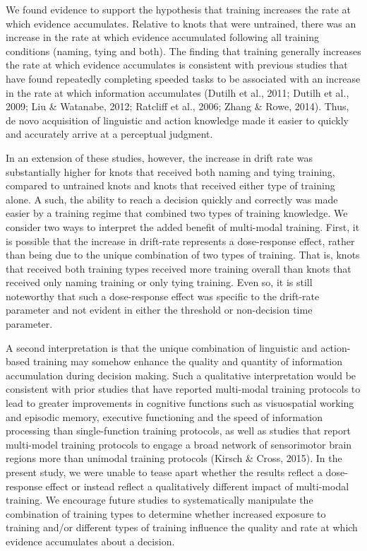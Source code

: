 \documentclass[
  man, donotrepeattitle,floatsintext]{apa6}
\begin{document}
We found evidence to support the hypothesis that training increases the rate at which evidence accumulates. Relative to knots that were untrained, there was an increase in the rate at which evidence accumulated following all training conditions (naming, tying and both). The finding that training generally increases the rate at which evidence accumulates is consistent with previous studies that have found repeatedly completing speeded tasks to be associated with an increase in the rate at which information accumulates (Dutilh et al., 2011; Dutilh et al., 2009; Liu \& Watanabe, 2012; Ratcliff et al., 2006; Zhang \& Rowe, 2014). Thus, de novo acquisition of linguistic and action knowledge made it easier to quickly and accurately arrive at a perceptual judgment.

In an extension of these studies, however, the increase in drift rate was substantially higher for knots that received both naming and tying training, compared to untrained knots and knots that received either type of training alone. A such, the ability to reach a decision quickly and correctly was made easier by a training regime that combined two types of training knowledge. We consider two ways to interpret the added benefit of multi-modal training. First, it is possible that the increase in drift-rate represents a dose-response effect, rather than being due to the unique combination of two types of training. That is, knots that received both training types received more training overall than knots that received only naming training or only tying training. Even so, it is still noteworthy that such a dose-response effect was specific to the drift-rate parameter and not evident in either the threshold or non-decision time parameter.

A second interpretation is that the unique combination of linguistic and action-based training may somehow enhance the quality and quantity of information accumulation during decision making. Such a qualitative interpretation would be consistent with prior studies that have reported multi-modal training protocols to lead to greater improvements in cognitive functions such as visuospatial working and episodic memory, executive functioning and the speed of information processing than single-function training protocols, as well as studies that report multi-model training protocols to engage a broad network of sensorimotor brain regions more than unimodal training protocols (Kirsch \& Cross, 2015). In the present study, we were unable to tease apart whether the results reflect a dose-response effect or instead reflect a qualitatively different impact of multi-modal training. We encourage future studies to systematically manipulate the combination of training types to determine whether increased exposure to training and/or different types of training influence the quality and rate at which evidence accumulates about a decision.
\end{document}
